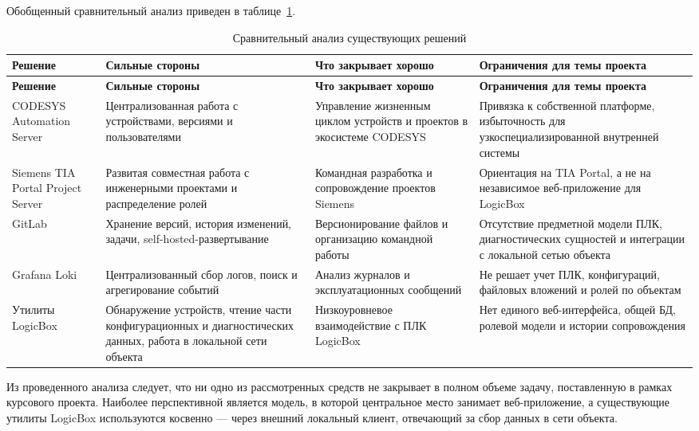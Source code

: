 Обобщенный сравнительный анализ приведен в таблице~\ref{tab:solutions_compare}.

\small
\begin{longtable}{|p{}|p{}|p{}|p{}|}
    \caption{Сравнительный анализ существующих решений} \label{tab:solutions_compare} \\
    \hline
    \textbf{Решение} & \textbf{Сильные стороны} & \textbf{Что закрывает хорошо} & \textbf{Ограничения для темы проекта} \\ \hline
    \endfirsthead

    \tabcont{\ref{tab:solutions_compare}}
    \textbf{Решение} & \textbf{Сильные стороны} & \textbf{Что закрывает хорошо} & \textbf{Ограничения для темы проекта} \\ \hline
    \endhead

    \hline
    \endfoot

    \hline
    \endlastfoot

    CODESYS Automation Server & Централизованная работа с устройствами, версиями и пользователями & Управление жизненным циклом устройств и проектов в экосистеме CODESYS & Привязка к собственной платформе, избыточность для узкоспециализированной внутренней системы \\ \hline
    Siemens TIA Portal Project Server & Развитая совместная работа с инженерными проектами и распределение ролей & Командная разработка и сопровождение проектов Siemens & Ориентация на TIA Portal, а не на независимое веб-приложение для LogicBox \\ \hline
    GitLab & Хранение версий, история изменений, задачи, self-hosted-развертывание & Версионирование файлов и организацию командной работы & Отсутствие предметной модели ПЛК, диагностических сущностей и интеграции с локальной сетью объекта \\ \hline
    Grafana Loki & Централизованный сбор логов, поиск и агрегирование событий & Анализ журналов и эксплуатационных сообщений & Не решает учет ПЛК, конфигураций, файловых вложений и ролей по объектам \\ \hline
    Утилиты LogicBox & Обнаружение устройств, чтение части конфигурационных и диагностических данных, работа в локальной сети объекта & Низкоуровневое взаимодействие с ПЛК LogicBox & Нет единого веб-интерфейса, общей БД, ролевой модели и истории сопровождения \\ \hline
\end{longtable}
\normalsize

Из проведенного анализа следует, что ни одно из рассмотренных средств не
закрывает в полном объеме задачу, поставленную в рамках курсового проекта.
Наиболее перспективной является модель, в которой центральное место занимает
веб-приложение, а существующие утилиты LogicBox используются косвенно --- через
внешний локальный клиент, отвечающий за сбор данных в сети объекта.

